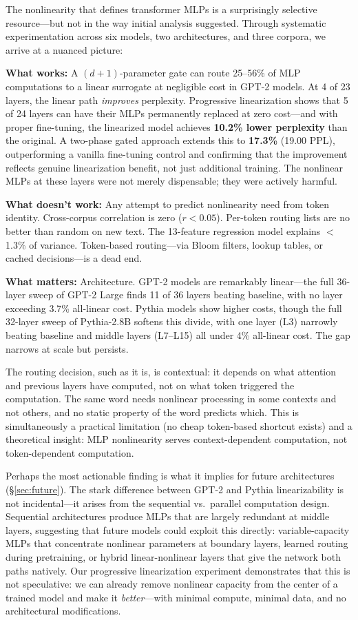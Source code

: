 \documentclass[11pt]{article}
\begin{document}
The nonlinearity that defines transformer MLPs is a surprisingly selective resource---but not in the way initial analysis suggested. Through systematic experimentation across six models, two architectures, and three corpora, we arrive at a nuanced picture:

\textbf{What works:} A $(d{+}1)$-parameter gate can route 25--56\% of MLP computations to a linear surrogate at negligible cost in GPT-2 models. At 4 of 23 layers, the linear path \textit{improves} perplexity. Progressive linearization shows that 5 of 24 layers can have their MLPs permanently replaced at zero cost---and with proper fine-tuning, the linearized model achieves \textbf{10.2\% lower perplexity} than the original. A two-phase gated approach extends this to \textbf{17.3\%} (19.00 PPL), outperforming a vanilla fine-tuning control and confirming that the improvement reflects genuine linearization benefit, not just additional training. The nonlinear MLPs at these layers were not merely dispensable; they were actively harmful.

\textbf{What doesn't work:} Any attempt to predict nonlinearity need from token identity. Cross-corpus correlation is zero ($r < 0.05$). Per-token routing lists are no better than random on new text. The 13-feature regression model explains $<$1.3\% of variance. Token-based routing---via Bloom filters, lookup tables, or cached decisions---is a dead end.

\textbf{What matters:} Architecture. GPT-2 models are remarkably linear---the full 36-layer sweep of GPT-2 Large finds 11 of 36 layers beating baseline, with no layer exceeding 3.7\% all-linear cost. Pythia models show higher costs, though the full 32-layer sweep of Pythia-2.8B softens this divide, with one layer (L3) narrowly beating baseline and middle layers (L7--L15) all under 4\% all-linear cost. The gap narrows at scale but persists.

The routing decision, such as it is, is contextual: it depends on what attention and previous layers have computed, not on what token triggered the computation. The same word needs nonlinear processing in some contexts and not others, and no static property of the word predicts which. This is simultaneously a practical limitation (no cheap token-based shortcut exists) and a theoretical insight: MLP nonlinearity serves context-dependent computation, not token-dependent computation.

Perhaps the most actionable finding is what it implies for future architectures (\S\ref{sec:future}). The stark difference between GPT-2 and Pythia linearizability is not incidental---it arises from the sequential vs.\ parallel computation design. Sequential architectures produce MLPs that are largely redundant at middle layers, suggesting that future models could exploit this directly: variable-capacity MLPs that concentrate nonlinear parameters at boundary layers, learned routing during pretraining, or hybrid linear-nonlinear layers that give the network both paths natively. Our progressive linearization experiment demonstrates that this is not speculative: we can already remove nonlinear capacity from the center of a trained model and make it \textit{better}---with minimal compute, minimal data, and no architectural modifications.
\end{document}
